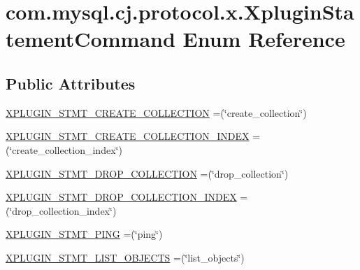 \hypertarget{enumcom_1_1mysql_1_1cj_1_1protocol_1_1x_1_1_xplugin_statement_command}{}\section{com.\+mysql.\+cj.\+protocol.\+x.\+Xplugin\+Statement\+Command Enum Reference}
\label{enumcom_1_1mysql_1_1cj_1_1protocol_1_1x_1_1_xplugin_statement_command}
\subsection*{Public Attributes}
\begin{DoxyCompactItemize}
\item 
\mbox{\hyperlink{enumcom_1_1mysql_1_1cj_1_1protocol_1_1x_1_1_xplugin_statement_command_a65981b3f328343ade10964ed27ce74c4}{X\+P\+L\+U\+G\+I\+N\+\_\+\+S\+T\+M\+T\+\_\+\+C\+R\+E\+A\+T\+E\+\_\+\+C\+O\+L\+L\+E\+C\+T\+I\+ON}} =(\char`\"{}create\+\_\+collection\char`\"{})
\item 
\mbox{\hyperlink{enumcom_1_1mysql_1_1cj_1_1protocol_1_1x_1_1_xplugin_statement_command_abfc5ac3306dac629ca92693a0426d4de}{X\+P\+L\+U\+G\+I\+N\+\_\+\+S\+T\+M\+T\+\_\+\+C\+R\+E\+A\+T\+E\+\_\+\+C\+O\+L\+L\+E\+C\+T\+I\+O\+N\+\_\+\+I\+N\+D\+EX}} =(\char`\"{}create\+\_\+collection\+\_\+index\char`\"{})
\item 
\mbox{\hyperlink{enumcom_1_1mysql_1_1cj_1_1protocol_1_1x_1_1_xplugin_statement_command_aa4c2e1b6e470e98fa48729bb89bdf0f9}{X\+P\+L\+U\+G\+I\+N\+\_\+\+S\+T\+M\+T\+\_\+\+D\+R\+O\+P\+\_\+\+C\+O\+L\+L\+E\+C\+T\+I\+ON}} =(\char`\"{}drop\+\_\+collection\char`\"{})
\item 
\mbox{\hyperlink{enumcom_1_1mysql_1_1cj_1_1protocol_1_1x_1_1_xplugin_statement_command_a075e70b0148956e8146acd445ffc0626}{X\+P\+L\+U\+G\+I\+N\+\_\+\+S\+T\+M\+T\+\_\+\+D\+R\+O\+P\+\_\+\+C\+O\+L\+L\+E\+C\+T\+I\+O\+N\+\_\+\+I\+N\+D\+EX}} =(\char`\"{}drop\+\_\+collection\+\_\+index\char`\"{})
\item 
\mbox{\hyperlink{enumcom_1_1mysql_1_1cj_1_1protocol_1_1x_1_1_xplugin_statement_command_a079fbb646d2173d4338b51626f35a8ec}{X\+P\+L\+U\+G\+I\+N\+\_\+\+S\+T\+M\+T\+\_\+\+P\+I\+NG}} =(\char`\"{}ping\char`\"{})
\item 
\mbox{\hyperlink{enumcom_1_1mysql_1_1cj_1_1protocol_1_1x_1_1_xplugin_statement_command_a6d0e30e0cacca921202e137c43dd794c}{X\+P\+L\+U\+G\+I\+N\+\_\+\+S\+T\+M\+T\+\_\+\+L\+I\+S\+T\+\_\+\+O\+B\+J\+E\+C\+TS}} =(\char`\"{}list\+\_\+objects\char`\"{})

\end{DoxyCompactItemize}
